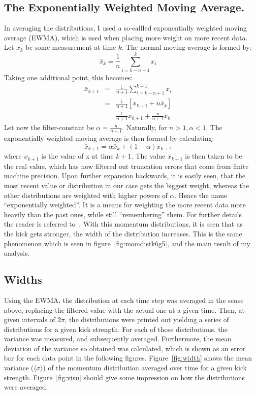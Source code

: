 \subsection{The Exponentially Weighted Moving Average.}
In averaging the distributions, I used a so-callled exponentially weighted moving average (EWMA), which is used when placing more weight on more recent data.
Let $x_k$ be some measurement at time $k$. The normal moving average is formed by:
	\begin{equation}\label{eq:normalma}
		\bar{x}_k=\frac{1}{n}\sum_{i=k-n+1}^{k}x_i
	\end{equation}
Taking one additional point, this becomes:
\begin{eqnarray}
	\bar{x}_{k+1}&=&\frac{1}{n+1}\sum_{i=k-n+1}^{k+1}x_i\nonumber\\
			{}&=&\frac{1}{n+1}\left[x_{k+1}+n\bar{x}_k\right]\nonumber\\
			{}&=&\frac{1}{n+1}x_{k+1}+\frac{n}{n+1}\bar{x}_k
\end{eqnarray}
Let now the filter-constant be $\alpha=\frac{n}{n+1}$. Naturally, for $n>1, \alpha<1$. The exponentially weighted moving average is then formed by calculating:
	\begin{equation}\label{eq:ewma}
		\bar{x}_{k+1}=\alpha\bar{x}_k+(1-\alpha)x_{k+1}
	\end{equation}
where $x_{k+1}$ is the value of x at time $k+1$. The value $\bar{x}_{k+1}$ is then taken to be the real value, which has now filtered out truncation errors that come from finite machine precision.
Upon further expansion backwards, it is easily seen, that the most recent value or distribution in our case gets the biggest weight, whereas the other distributions are weighted with higher powers of $\alpha$. Hence the name ``exponentially weighted''. It is a means for weighting the more recent data more heavily than the past ones, while still ``remembering'' them. For further details the reader is referred to~\cite{ewma}. With this momentum distributions, it is seen that as the kick gets stronger, the width of the distribution increases. This is the same phenomenon which is seen in figure~\ref{fig:momdistk6g5}, and the main result of my analysis.

\subsection{Widths}
Using the EWMA, the distribution at each time step was averaged in the sense above, replacing the filtered value with the actual one at a given time.
Then, at given intervals of $2\pi$, the distributions were printed out yielding a series of distributions for a given kick strength. For each of those distributions, the variance was measured, and subsequently averaged. Furthermore, the mean deviation of the variance so obtained was calculated, which is shown as an error bar for each data point in the following figures. Figure~\ref{fig:width} shows the mean variance ($\langle\sigma\rangle$) of the momentum distribution averaged over time for a given kick strength.
Figure~\ref{fig:visu} should give some impression on how the distributions were averaged.


